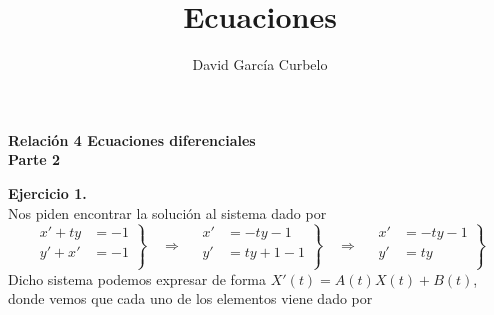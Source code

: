 \documentclass[fleqn]{article}
\author{David García Curbelo}
\title{Ecuaciones}
\begin{document}
    \setcounter{page}{1}
    \pagestyle{plain}

    \begin{center}
        {\large\bf{Relación 4 Ecuaciones diferenciales}} \\
        \bf{Parte 2}\\
        
    \end{center}

    \textbf{Ejercicio 1. } \\

    Nos piden encontrar la solución al sistema dado por 
    \begin{equation*}
        \left.
        \begin{aligned}
            x' + ty &= -1\\
            y' + x' &= -1\\
        \end{aligned}
        \right\}\quad \Rightarrow \quad
        \left.
        \begin{aligned}
            x' &= -ty -1\\
            y' &= ty + 1 - 1\\
        \end{aligned}
        \right\}\quad \Rightarrow \quad
        \left.
        \begin{aligned}
            x' &= -ty -1\\
            y' &= ty\\
        \end{aligned}
        \right\} 
    \end{equation*}
    Dicho sistema podemos expresar de forma $X'(t)=A(t)X(t) + B(t)$, donde vemos que cada uno de los elementos viene dado por
\end{document}
